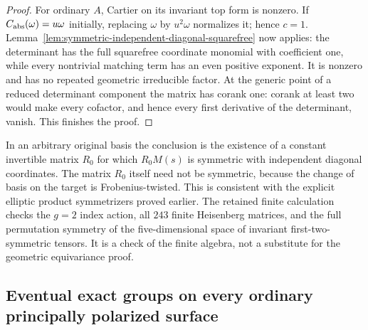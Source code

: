 \begin{proof}
For ordinary $A$, Cartier on its invariant top form is nonzero.
If $C_{\rm abs}(\omega)=u\omega$ initially, replacing $\omega$
by $u^2\omega$ normalizes it; hence $c=1$.
Lemma~\ref{lem:symmetric-independent-diagonal-squarefree} now
applies: the determinant has the full squarefree coordinate
monomial with coefficient one, while every nontrivial matching
term has an even positive exponent. It is nonzero and has no
repeated geometric irreducible factor.
At the generic point of a reduced determinant component the
matrix has corank one: corank at least two would make every
cofactor, and hence every first derivative of the determinant,
vanish. This finishes the proof.
\end{proof}

\begin{remark}\label{auto:A_monodromy:bcd64c5e340f}

In an arbitrary original basis the conclusion is the existence of
a constant invertible matrix $R_0$ for which $R_0M(s)$ is symmetric
with independent diagonal coordinates. The matrix $R_0$ itself
need not be symmetric, because the change of basis on the target
is Frobenius-twisted. This is consistent with the explicit elliptic
product symmetrizers proved earlier.
The retained finite calculation
checks the $g=2$ index action, all $243$ finite Heisenberg matrices,
and the full permutation symmetry of the five-dimensional space of
invariant first-two-symmetric tensors. It is a check of the finite
algebra, not a substitute for the geometric equivariance proof.
\end{remark}


\subsection{Eventual exact groups on every ordinary principally polarized surface}
\label{subsec:ordinary-ppav-surface-full-groups}

